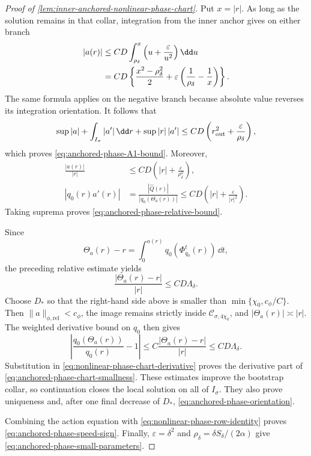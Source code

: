 \begin{proof}[Proof of
\cref{lem:inner-anchored-nonlinear-phase-chart}]
Put \(x=|r|\).  As long as the solution remains in that collar, integration
from the inner anchor gives on either branch
\begin{align}
 |a(r)|
 &\le CD\int_{\rho_\delta}^{x}
       \left(u+\frac{\varepsilon}{u^2}\right)\dd u\notag\\
 &=CD\left\{\frac{x^2-\rho_\delta^2}{2}
       +\varepsilon\left(\frac1{\rho_\delta}-\frac1x\right)\right\}.
                                                        \label{eq:anchored-phase-primitive-bound}
\end{align}
The same formula applies on the negative branch because absolute value
reverses its integration orientation.  It follows that
\[
 \sup|a|+\int_{I_\sigma}|a'|\,\dd r
       +\sup|r|\,|a'|
 \le CD\left(r_{\rm out}^2+\frac{\varepsilon}{\rho_\delta}\right),
\]
which proves \cref{eq:anchored-phase-A1-bound}.  Moreover,
\begin{align*}
 \frac{|a(r)|}{|r|}
 &\le CD\left(|r|+\frac{\varepsilon}{\rho_\delta^2}\right),\\
 |q_0(r)a'(r)|
 &=\frac{|\widehat Q(r)|}{|q_0(\Theta_a(r))|}
 \le CD\left(|r|+\frac{\varepsilon}{|r|^2}\right).
\end{align*}
Taking suprema proves \cref{eq:anchored-phase-relative-bound}.

Since
\[
 \Theta_a(r)-r
 =\int_0^{a(r)}q_0(\Phi_{q_0}^t(r))\,\dd t,
\]
the preceding relative estimate yields
\[
 \frac{|\Theta_a(r)-r|}{|r|}\le CD\Lambda_\delta.
\]
Choose \(D_*\) so that the right-hand side above is smaller than
\(\min\{\chi_0,c_\phi/C\}\).  Then
\(\|a\|_{\phi,\mathrm{rel}}<c_\phi\), the image remains strictly inside
\(\mathcal C_{\sigma,4\chi_0}\), and
\(|\Theta_a(r)|\asymp|r|\).  The weighted derivative
bound on \(q_0\) then gives
\[
 \left|\frac{q_0(\Theta_a(r))}{q_0(r)}-1\right|
 \le C\frac{|\Theta_a(r)-r|}{|r|}
 \le CD\Lambda_\delta.
\]
Substitution in \cref{eq:nonlinear-phase-chart-derivative} proves the
derivative part of \cref{eq:anchored-phase-chart-smallness}.  These
estimates improve the bootstrap collar, so continuation closes the local
solution on all of \(I_\sigma\).  They also prove uniqueness and,
after one final decrease of \(D_*\),
\cref{eq:anchored-phase-orientation}.

Combining the action equation with
\cref{eq:nonlinear-phase-row-identity} proves
\cref{eq:anchored-phase-speed-sign}.  Finally,
\(\varepsilon=\delta^2\) and
\(\rho_\delta=\delta S_\delta/(2\alpha)\) give
\cref{eq:anchored-phase-small-parameters}.
\end{proof}

